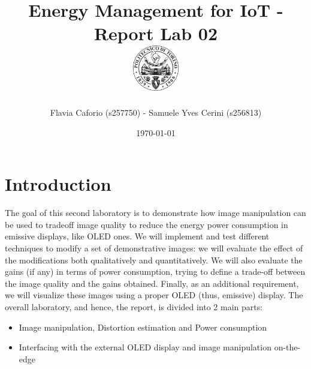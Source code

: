 \documentclass[a4paper]{article}
\begin{document}
    \title{
        Energy Management for IoT - Report Lab 02 \\[0.5cm]
        \includegraphics[width=0.15\textwidth]{PoliLogo.png}%
    }
    \author{Flavia Caforio (s257750) - Samuele Yves Cerini (s256813)}
    \date{\today}
    \maketitle

    \tableofcontents

%
\section{Introduction}
    The goal of this second laboratory is to demonstrate how image manipulation can be used to tradeoff image quality to reduce the energy power consumption in emissive displays, like OLED ones. We will implement and test different techniques to modify a set of demonstrative images: we will evaluate the effect of the modifications both qualitatively and quantitatively. We will also evaluate the gains (if any) in terms of power consumption, trying to define a trade-off between the image quality and the gains obtained. Finally, as an additional requirement, we will visualize these images using a proper OLED (thus, emissive) display.
    The overall laboratory, and hence, the report, is divided into 2 main parts:
    \begin{itemize}
        \item Image manipulation, Distortion estimation and Power consumption
        \item Interfacing with the external OLED display and image manipulation on-the-edge
    \end{itemize}
\end{document}
